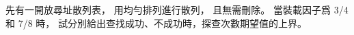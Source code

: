 \startEXERCISE
先有一開放尋址散列表，
用均勻排列進行散列，
且無需刪除。
當裝載因子爲 3/4 和 7/8 時，
試分別給出查找成功、不成功時，探查次數期望值的上界。
\stopEXERCISE

\startANSWER
\startformula\startmathalignment[%
  m=3, n=1, distance=3em]
\NC \NC {} \NC {} \NR
\NC {}   \NR
\NC {}\ln{}
    \NC {}
    \NC {} \NR
\stopmathalignment\stopformula
\stopANSWER

